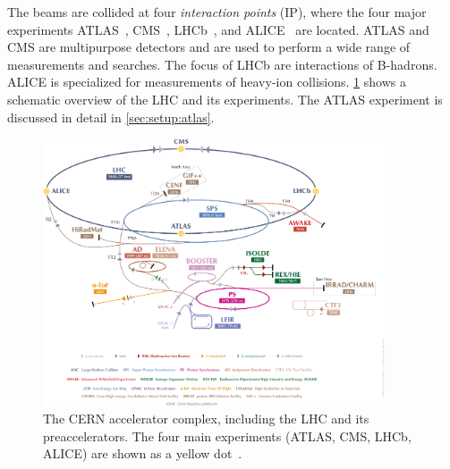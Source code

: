 The beams are collided at four \emph{interaction points} (IP), where the four major experiments
ATLAS~\cite{ATLAS}, CMS~\cite{CMS}, LHCb~\cite{LHCb}, and ALICE~\cite{ALICE} are located.
ATLAS and CMS are multipurpose detectors and are used to perform a wide range of measurements and searches.
The focus of LHCb are interactions of B-hadrons.
ALICE is specialized for measurements of heavy-ion collisions.
\cref{fig:setup:accelerators} shows a schematic overview of the LHC and its experiments.
The ATLAS experiment is discussed in detail in \cref{sec:setup:atlas}.
\begin{figure}[htb]
    \centering
    \includegraphics[width=0.9\textwidth]{./figures/setup/accelerators.png}
    \caption{The CERN accelerator complex, including the LHC and its preaccelerators.
             The four main experiments (ATLAS, CMS, LHCb, ALICE) are shown as a yellow dot~\cite{ImageLHC}.}\label{fig:setup:accelerators}
\end{figure}

